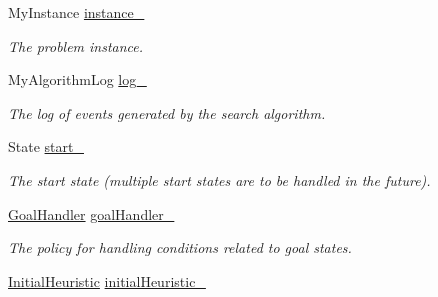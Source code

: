 \begin{DoxyCompactItemize}
\item 
My\+Instance \hyperlink{structAlgorithm_a1a5383360e58b9f299f2e4f23d9261af}{instance\+\_\+}\hypertarget{structAlgorithm_a1a5383360e58b9f299f2e4f23d9261af}{}\label{structAlgorithm_a1a5383360e58b9f299f2e4f23d9261af}

\begin{DoxyCompactList}\small\item\em The problem instance. \end{DoxyCompactList}\item 
My\+Algorithm\+Log \hyperlink{structAlgorithm_adfbeae4f5a72307228b54c4cf28e5e40}{log\+\_\+}\hypertarget{structAlgorithm_adfbeae4f5a72307228b54c4cf28e5e40}{}\label{structAlgorithm_adfbeae4f5a72307228b54c4cf28e5e40}

\begin{DoxyCompactList}\small\item\em The log of events generated by the search algorithm. \end{DoxyCompactList}\item 
State \hyperlink{structAlgorithm_aeca9a4a018cc8229cbcfee80b6127860}{start\+\_\+}\hypertarget{structAlgorithm_aeca9a4a018cc8229cbcfee80b6127860}{}\label{structAlgorithm_aeca9a4a018cc8229cbcfee80b6127860}

\begin{DoxyCompactList}\small\item\em The start state (multiple start states are to be handled in the future). \end{DoxyCompactList}\item 
\hyperlink{structAlgorithm_a915f86cad5585ba0adb63d017c7afdb2}{Goal\+Handler} \hyperlink{structAlgorithm_a3117a85e8d077232aa65567c9060f1a8}{goal\+Handler\+\_\+}\hypertarget{structAlgorithm_a3117a85e8d077232aa65567c9060f1a8}{}\label{structAlgorithm_a3117a85e8d077232aa65567c9060f1a8}

\begin{DoxyCompactList}\small\item\em The policy for handling conditions related to goal states. \end{DoxyCompactList}\item 
\hyperlink{structAlgorithm_a01a7b5d204e82e4aed951680a38013a5}{Initial\+Heuristic} \hyperlink{structAlgorithm_a5eab4fa992d98013d12be09848cd44f9}{initial\+Heuristic\+\_\+}\hypertarget{structAlgorithm_a5eab4fa992d98013d12be09848cd44f9}{}\label{structAlgorithm_a5eab4fa992d98013d12be09848cd44f9}


\end{DoxyCompactItemize}
